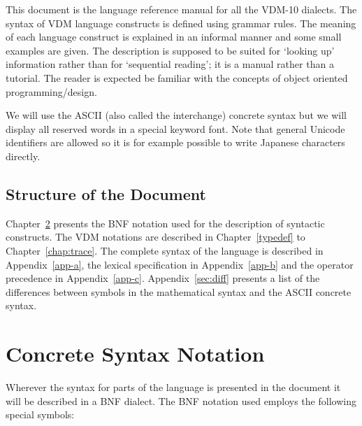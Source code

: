 \documentclass{overturerepchap}
\begin{document}
This document is the language reference manual for all the VDM-10 dialects.  The
syntax of VDM language constructs is defined using grammar rules.
The meaning of each language construct is explained in an informal
manner and some small examples are given. The description is supposed
to be suited for `looking up' information rather than for `sequential
reading'; it is a manual rather than a tutorial.  The reader is
expected be familiar with the concepts of object oriented
programming/design.

We will use the ASCII (also called the interchange)
concrete syntax but we will display all reserved words in a special
keyword font. Note that general Unicode identifiers are allowed so
it is for example possible to write Japanese characters directly.

\section{Structure of the Document}

Chapter~\ref{syntax-notation} presents the BNF notation used for the
description of syntactic constructs.  The VDM notations are described
in Chapter~\ref{typedef} to Chapter~\ref{chap:trace}.
The complete syntax of the language is described in
Appendix~\ref{app-a}, the lexical specification in
Appendix~\ref{app-b} and the operator precedence in
Appendix~\ref{app-c}. Appendix~\ref{sec:diff} presents a list of the
differences between symbols in the mathematical syntax and the ASCII
concrete syntax. 

\chapter{Concrete Syntax Notation}
\label{syntax-notation}


Wherever the syntax for parts of the language is presented in the
document it will be described in a BNF dialect. The BNF notation
used employs the following special symbols:
\end{document}
